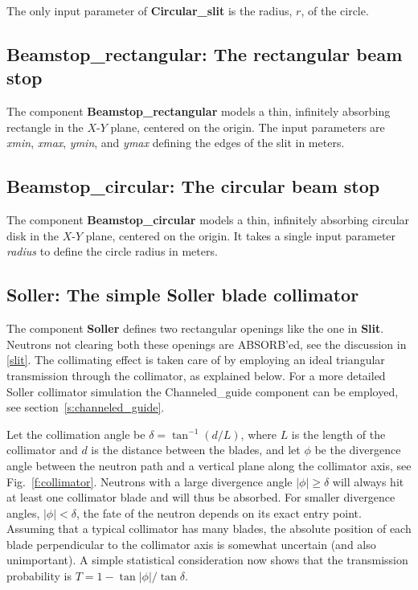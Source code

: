 The only input parameter of {\bf Circular\_slit} is
the radius, $r$, of the circle.

\subsection{Beamstop\_rectangular: The rectangular beam stop}
\label{s:Beamstop_rectangular}
The component {\bf Beamstop\_rectangular} models a thin, infinitely
absorbing rectangle in the $X$-$Y$ plane, centered on the origin. The
input parameters are \textit{xmin}, \textit{xmax}, \textit{ymin}, and
\textit{ymax} defining the edges of the slit in meters.


\subsection{Beamstop\_circular: The circular beam stop}
\label{s:Beamstop_circular}
The component {\bf Beamstop\_circular} models a thin, infinitely
absorbing circular disk in the $X$-$Y$ plane, centered on the origin. It
takes a single input parameter \textit{radius} to define the circle
radius in meters.


\subsection{Soller: The simple Soller blade collimator}
The component {\bf Soller} defines two rectangular openings
like the one in {\bf Slit}. Neutrons not clearing both these
openings are ABSORB'ed, see the discussion in \ref{slit}.
The collimating effect is taken care of by employing an ideal
triangular transmission through the collimator, as explained below.
For a more detailed Soller collimator simulation the Channeled\_guide
component can be employed, see section~\ref{s:channeled_guide}.

Let the collimation angle be $\delta = \tan^{-1}(d/L)$,
where $L$ is the length of the collimator
and $d$ is the distance between the blades,
and let $\phi$ be the divergence angle between the 
neutron path and a vertical plane along the collimator axis, 
see Fig.~\ref{f:collimator}. Neutrons with a large 
divergence angle $|\phi| \geq \delta$ will always
hit at least one collimator blade and will thus be absorbed.
For smaller divergence angles, $|\phi| < \delta$, the fate of the
neutron depends on its exact entry point.
Assuming that a typical collimator has many blades, the
absolute position of each blade perpendicular to the collimator axis
is somewhat uncertain (and also unimportant).
A simple statistical consideration now shows that the transmission
probability is $T = 1-\tan|\phi|/\tan\delta$.

